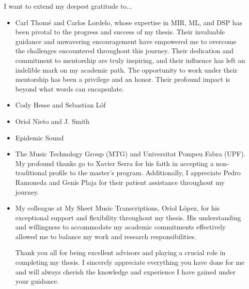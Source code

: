 

\begin{acknowledgement}

I want to extend my deepest gratitude to...

\begin{itemize}
\item Carl Thomé and Carlos Lordelo, whose expertise in MIR, ML, and DSP has been pivotal to the progress and success of my thesis. Their invaluable guidance and unwavering encouragement have empowered me to overcome the challenges encountered throughout this journey. Their dedication and commitment to mentorship are truly inspiring, and their influence has left an indelible mark on my academic path. The opportunity to work under their mentorship has been a privilege and an honor. Their profound impact is beyond what words can encapsulate.

\vspace*{3mm}
\item Cody Hesse and Sebastian Löf

\vspace*{3mm}
\item Oriol Nieto and J. Smith

\vspace*{3mm}
\item Epidemic Sound

\vspace*{3mm}
\item The Music Technology Group (MTG) and Universitat Pompeu Fabra (UPF). My profound thanks go to Xavier Serra for his faith in accepting a non-traditional profile to the master's program. Additionally, I appreciate Pedro Ramoneda and Genís Plaja for their patient assistance throughout my journey.

\vspace*{3mm}
\item My colleague at My Sheet Music Transcriptions, Oriol López, for his exceptional support and flexibility throughout my thesis. His understanding and willingness to accommodate my academic commitments effectively allowed me to balance my work and research responsibilities.

\vspace*{3mm}
Thank you all for being excellent advisors and playing a crucial role in completing my thesis. I sincerely appreciate everything you have done for me and will always cherish the knowledge and experience I have gained under your guidance.

\vspace*{3mm}
\end{itemize}

\newpage
\end{acknowledgement}